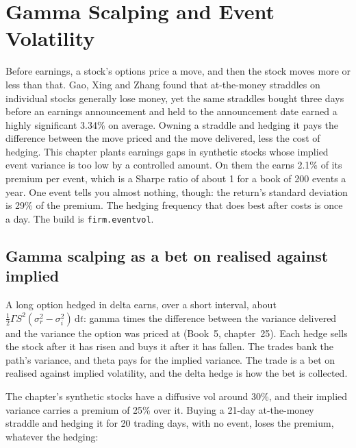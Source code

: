 \chapter{Gamma Scalping and Event Volatility}\label{ch:s2:gamma-scalping-and-event-volatility}

Before earnings, a stock's options price a move, and then the stock moves more or less than that. Gao, Xing and Zhang found that at-the-money
straddles on individual stocks generally lose money, yet the same straddles bought three days before an earnings announcement and held to the
announcement date earned a highly significant 3.34\% on average. Owning a straddle and hedging it pays the difference between the move priced and the
move delivered, less the cost of hedging. This chapter plants earnings gaps in synthetic stocks whose implied event variance is too low by a
controlled amount. On them the  earns 2.1\% of its premium per event, which is a Sharpe ratio of about 1 for a book of 200 events a year.
One event tells you almost nothing, though: the return's standard deviation is 29\% of the premium. The hedging frequency that does best after costs
is once a day. The build is \texttt{firm.eventvol}.

\section{Gamma scalping as a bet on realised against implied}

A long option hedged in delta earns, over a short interval, about $\tfrac12\Gamma S^2(\sigma_r^2 - \sigma_i^2)\,\mathrm{d}t$: gamma times the
difference between the variance delivered and the variance the option was priced at (Book~5, chapter~25). Each hedge sells the stock after it has
risen and buys it after it has fallen. The trades bank the path's variance, and theta pays for the implied variance. The trade is a bet on realised
against implied volatility, and the delta hedge is how the bet is collected.

The chapter's synthetic stocks have a diffusive vol around 30\%, and their implied variance carries a premium of 25\% over it. Buying a 21-day
at-the-money straddle and hedging it for 20 trading days, with no event, loses the premium, whatever the hedging:


